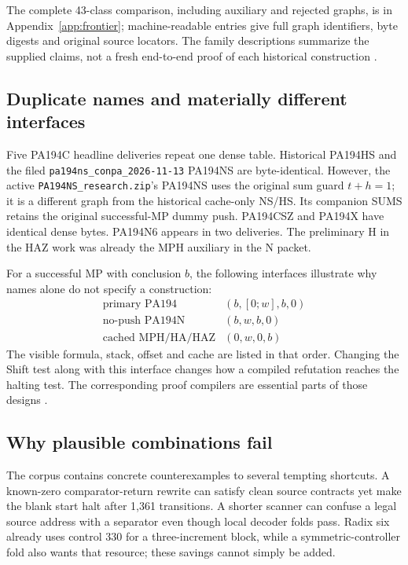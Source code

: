 \documentclass[11pt,letterpaper]{article}
\begin{document}
The complete 43-class comparison, including auxiliary and rejected
graphs, is in Appendix~\ref{app:frontier}; machine-readable entries give
full graph identifiers, byte digests and original source locators.
The family descriptions summarize the supplied claims, not a fresh
end-to-end proof of each historical construction
\cite{primary,radix,jd,qpacket,npacket,active}.

\subsection{Duplicate names and materially different interfaces}

Five PA194C headline deliveries repeat one dense table. Historical
PA194HS and the filed \texttt{pa194ns\_conpa\_2026-11-13} PA194NS are
byte-identical. However, the active \texttt{PA194NS\_research.zip}'s
PA194NS uses the original sum guard $t+h=1$; it is a different graph
from the historical cache-only NS/HS. Its companion SUMS retains the
original successful-MP dummy push. PA194CSZ and PA194X have identical
dense bytes. PA194N6 appears in two deliveries. The preliminary H in
the HAZ work was already the MPH auxiliary in the N packet.

For a successful MP with conclusion $b$, the following interfaces
illustrate why names alone do not specify a construction:
\[
\begin{array}{c|c}
\text{primary PA194}&(b,[0;w],b,0)\\
\text{no-push PA194N}&(b,w,b,0)\\
\text{cached MPH/HA/HAZ}&(0,w,0,b)
\end{array}
\]
The visible formula, stack, offset and cache are listed in that order.
Changing the Shift test along with this interface changes how a compiled
refutation reaches the halting test. The corresponding proof compilers
are essential parts of those designs \cite{npacket,active}.

\subsection{Why plausible combinations fail}

The corpus contains concrete counterexamples to several tempting
shortcuts. A known-zero comparator-return rewrite can satisfy clean source
contracts yet make the blank start halt after 1,361 transitions. A shorter
scanner can confuse a legal source address with a separator even though
local decoder folds pass. Radix six already uses control 330 for a
three-increment block, while a symmetric-controller fold also wants that
resource; these savings cannot simply be added.
\end{document}

